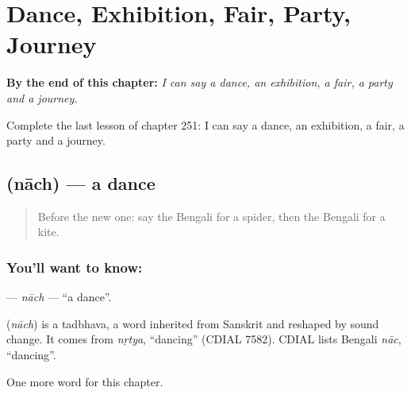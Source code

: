 
\chapter{Dance, Exhibition, Fair, Party, Journey}
\label{ch:bn-dance-exhibition-fair-party-journey}

\begin{chapteropening}
\textbf{By the end of this chapter:} \emph{I can say a dance, an exhibition, a fair, a party and a journey.}

Complete the last lesson of chapter 251: I can say a dance, an exhibition, a fair, a party and a journey.
\end{chapteropening}

\section[\texorpdfstring{\bn{নাচ} (nāch)}{নাচ (nāch)}]{ (nāch) — a dance}

\label{lesson:BN-C251-nach}



\begin{quote}
Before the new one: say the Bengali for a spider, then the Bengali for a kite.
\end{quote}

\subsection*{You'll want to know: }
\textbf{} — \emph{nāch} — \textquotedblleft{}a dance\textquotedblright{}.

\begin{cousinweb}
\textbf{} (\emph{nāch}) is a tadbhava, a word inherited from Sanskrit and reshaped by sound change. It comes from \emph{nṛtya}, \textquotedblleft{}dancing\textquotedblright{} (CDIAL 7582). CDIAL lists Bengali \emph{nāc}, \textquotedblleft{}dancing\textquotedblright{}.
\end{cousinweb}

\begin{grammarlens}[title={What you've built}]
One more word for this chapter.
\end{grammarlens}

